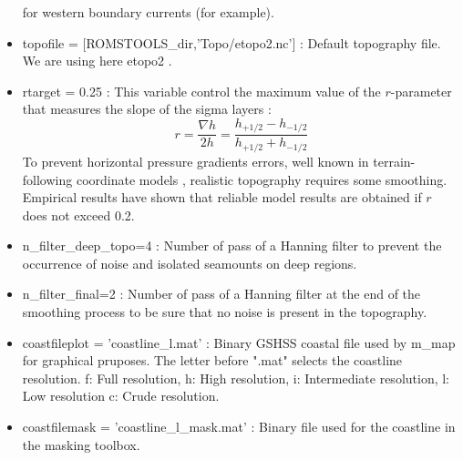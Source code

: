 \begin{itemize}
for western boundary currents (for example).
\item topofile = [ROMSTOOLS\_dir,'Topo/etopo2.nc'] : Default topography file. 
We are using here etopo2 \citep{Smi97}. 
\item rtarget = 0.25 : This variable control the maximum value of the $r$-parameter
that measures the slope of the sigma layers \citep{Bec93}:
$$
r=\frac{\nabla h}{2h}=\frac{h_{+1/2}-h_{-1/2}}{h_{+1/2}+h_{-1/2}}  
$$
To prevent horizontal pressure gradients errors, well known in
terrain-following coordinate models \citep{Han91}, realistic topography
requires some smoothing. Empirical results have shown that reliable
model results are obtained if $r$ does not exceed 0.2.
\item n\_filter\_deep\_topo=4 : Number of pass of a Hanning filter to prevent 
the occurrence of noise and isolated seamounts on deep regions.
\item n\_filter\_final=2 : Number of pass of a Hanning filter at the end of the
smoothing process to be sure that no noise is present in the topography.
\item coastfileplot = 'coastline\_l.mat' : Binary GSHSS coastal file used by m\_map
for graphical pruposes. The letter before ".mat" selects the coastline resolution.
f: Full resolution, h: High resolution, i: Intermediate resolution, l: Low resolution
c: Crude resolution.
\item coastfilemask = 'coastline\_l\_mask.mat' :  Binary file used
for the coastline in the masking toolbox.
\end{itemize}

